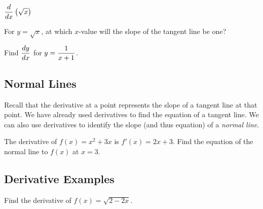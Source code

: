\documentclass[12pt]{article}
\begin{document}
\hspace{10mm} $\displaystyle\frac{d}{dx}\left(\sqrt{x}\right)$

\vspace{50mm}

\Example For $y=\sqrt{x}$, at which $x$-value will the slope of the tangent line be one?

\vspace{50mm}

\Example Find $\displaystyle\frac{dy}{dx}$ for $y=\displaystyle\frac{1}{x+1}$.

\newpage

\subsection*{Normal Lines}

Recall that the derivative at a point represents the slope of a tangent line at that point. We have already used derivatives to find the equation of a tangent line. We can also use derivatives to identify the slope (and thus equation) of a \textit{normal line}.

\vspace{3mm}


\vspace{3mm}


\vspace{5mm}

\Example The derivative of $f(x)=x^2+3x$ is $f'(x)=2x+3$. Find the equation of the normal line to $f(x)$ at $x=3$.

\vspace{40mm}

\subsection*{Derivative Examples}

\Example Find the derivative of $f(x)=\sqrt{2-2x}$.
\end{document}
